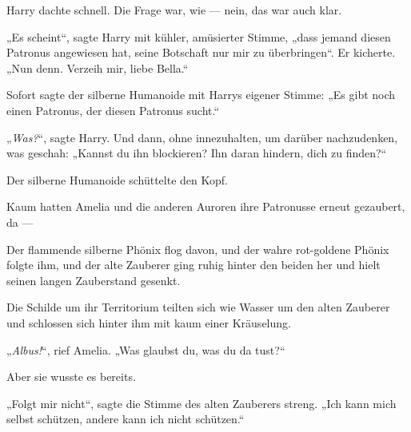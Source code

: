 Harry dachte schnell. Die Frage war, wie — nein, das war auch klar.

„Es scheint“, sagte Harry mit kühler, amüsierter Stimme, „dass jemand diesen Patronus angewiesen hat, seine Botschaft nur mir zu überbringen“. Er kicherte.
„Nun denn. Verzeih mir, liebe Bella.“ 

Sofort sagte der silberne Humanoide mit Harrys eigener Stimme:
„Es gibt noch einen Patronus, der diesen Patronus sucht.“

„\emph{Was?}“, sagte Harry. Und dann, ohne innezuhalten, um darüber nachzudenken, was geschah:
„Kannst du ihn blockieren? Ihn daran hindern, dich zu finden?“

Der silberne Humanoide schüttelte den Kopf.

\later

Kaum hatten Amelia und die anderen Auroren ihre Patronusse erneut gezaubert, da —

Der flammende silberne Phönix flog davon, und der wahre rot-goldene Phönix folgte ihm, und der alte Zauberer ging ruhig hinter den beiden her und hielt seinen langen Zauberstand gesenkt.

Die Schilde um ihr Territorium teilten sich wie Wasser um den alten Zauberer und schlossen sich hinter ihm mit kaum einer Kräuselung.

„\emph{Albus!}“, rief Amelia.
„Was glaubst du, was du da tust?“

Aber sie wusste es bereits.

„Folgt mir nicht“, sagte die Stimme des alten Zauberers streng.
„Ich kann mich selbst schützen, andere kann ich nicht schützen.“

